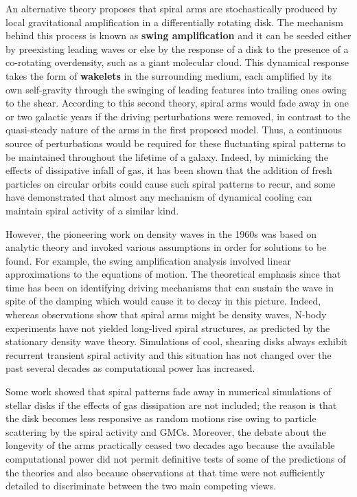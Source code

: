 \documentclass[a4paper,10pt]{article}
\begin{document}
{\noindent}An alternative theory proposes that spiral arms are stochastically produced by local gravitational amplification in a differentially rotating disk. The mechanism behind this process is known as \textbf{swing amplification} and it can be seeded either by preexisting leading waves or else by the response of a disk to the presence of a co-rotating overdensity, such as a giant molecular cloud. This dynamical response takes the form of \textbf{wakelets} in the surrounding medium, each amplified by its own self-gravity through the swinging of leading features into trailing ones owing to the shear. According to this second theory, spiral arms would fade away in one or two galactic years if the driving perturbations were removed, in contrast to the quasi-steady nature of the arms in the first proposed model. Thus, a continuous source of perturbations would be required for these fluctuating spiral patterns to be maintained throughout the lifetime of a galaxy. Indeed, by mimicking the effects of dissipative infall of gas, it has been shown that the addition of fresh particles on circular orbits could cause such spiral patterns to recur, and some have demonstrated that almost any mechanism of dynamical cooling can maintain spiral activity of a similar kind.

{\noindent}However, the pioneering work on density waves in the 1960s was based on analytic theory and invoked various assumptions in order for solutions to be found. For example, the swing amplification analysis involved linear approximations to the equations of motion. The theoretical emphasis since that time has been on identifying driving mechanisms that can sustain the wave in spite of the damping which would cause it to decay in this picture. Indeed, whereas observations show that spiral arms might be density waves, N-body experiments have not yielded long-lived spiral structures, as predicted by the stationary density wave theory. Simulations of cool, shearing disks always exhibit recurrent transient spiral activity and this situation has not changed over the past several decades as computational power has increased.

{\noindent}Some work showed that spiral patterns fade away in numerical simulations of stellar disks if the effects of gas dissipation are not included; the reason is that the disk becomes less responsive as random motions rise owing to particle scattering by the spiral activity and GMCs. Moreover, the debate about the longevity of the arms practically ceased two decades ago because the available computational power did not permit definitive tests of some of the predictions of the theories and also because observations at that time were not sufficiently detailed to discriminate between the two main competing views.
\end{document}
